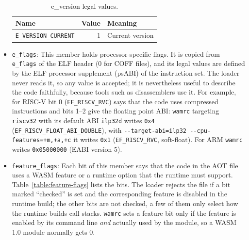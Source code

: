 \documentclass{article}
\begin{document}
\begin{itemize}
        \begin{table}[H]
        \centering
        \begin{tabular}{lrl}
            \hline
            Name & Value & Meaning \\
            \hline
             \verb|E_VERSION_CURRENT| & 1 & Current version \\
            \hline
        \end{tabular}
        \caption{e\_version legal values.}
        \label{table:e-version-legal-values}
        \end{table}

    \item \verb|e_flags|:
        This member holds processor-specific flags.
        It is copied from \verb|e_flags| of the ELF header \cite[Ch.~2]{elf-spec-gabi-v42} (0 for COFF files), and its legal values are defined by the ELF processor supplement (psABI) of the instruction set.
        The loader never reads it, so any value is accepted; it is nevertheless useful to describe the code faithfully, because tools such as disassemblers use it.
        For example, for RISC-V \cite[Ch.~8]{riscv-elf-psabi-v1.0} bit 0 (\verb|EF_RISCV_RVC|) says that the code uses compressed instructions and bits 1--2 give the floating point ABI: \texttt{wamrc} targeting \texttt{riscv32} with its default ABI \texttt{ilp32d} writes \verb|0x4| (\verb|EF_RISCV_FLOAT_ABI_DOUBLE|), with \verb|--target-abi=ilp32 --cpu-features=+m,+a,+c| it writes \verb|0x1| (\verb|EF_RISCV_RVC|, soft-float).
        For ARM \texttt{wamrc} writes \verb|0x05000000| (EABI version 5).

    \item \verb|feature_flags|:
        Each bit of this member says that the code in the AOT file uses a WASM feature or a runtime option that the runtime must support.
        Table~\ref{table:feature-flags} lists the bits.
        The loader rejects the file if a bit marked ``checked'' is set and the corresponding feature is disabled in the runtime build; the other bits are not checked, a few of them only select how the runtime builds call stacks.
        \texttt{wamrc} sets a feature bit only if the feature is enabled by its command line \emph{and} actually used by the module, so a WASM 1.0 module normally gets 0.


\end{itemize}
\end{document}
